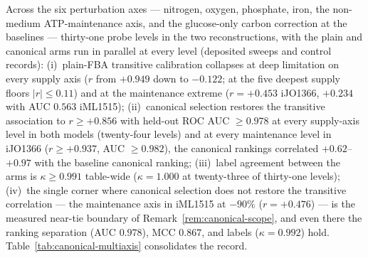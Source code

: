 \begin{proposition}
\label{prop:canonical-multiaxis}
Across the six perturbation axes --- nitrogen, oxygen, phosphate,
iron, the non-medium ATP-maintenance axis, and the glucose-only
carbon correction at the baselines --- thirty-one probe levels in
the two reconstructions, with the plain and canonical arms run in
parallel at every level (deposited sweeps and control records):
(i)~plain-FBA transitive calibration collapses at deep limitation
on every supply axis ($r$ from $+0.949$ down to $-0.122$; at the
five deepest supply floors $|r|\le0.11$) and at the maintenance
extreme ($r=+0.453$ iJO1366, $+0.234$ with AUC $0.563$ iML1515);
(ii)~canonical selection restores the transitive association to
$r\ge+0.856$ with held-out ROC AUC $\ge0.978$ at every supply-axis
level in both models (twenty-four levels) and at every maintenance
level in iJO1366
($r\ge+0.937$, AUC $\ge0.982$), the canonical rankings correlated
$+0.62$--$+0.97$ with the baseline canonical ranking;
(iii)~label agreement between the arms is $\kappa\ge0.991$
table-wide ($\kappa=1.000$ at twenty-three of thirty-one levels);
(iv)~the single corner where canonical selection does not restore
the transitive correlation --- the maintenance axis in iML1515 at
$-90\%$ ($r=+0.476$) --- is the measured near-tie boundary of
Remark~\ref{rem:canonical-scope}, and even there the ranking
separation (AUC $0.978$), MCC $0.867$, and labels ($\kappa=0.992$)
hold. Table~\ref{tab:canonical-multiaxis} consolidates the record.
\end{proposition}

